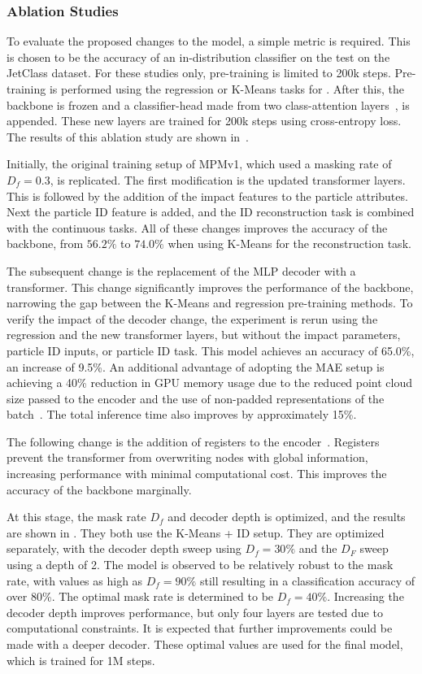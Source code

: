 \subsubsection{Ablation Studies}

To evaluate the proposed changes to the model, a simple metric is required.
This is chosen to be the accuracy of an in-distribution classifier on the test on the JetClass dataset.
For these studies only, pre-training is limited to 200k steps.
Pre-training is performed using the regression or K-Means tasks for \xc.
After this, the backbone is frozen and a classifier-head made from two class-attention layers~\cite{GoingDeeper}, is appended.
These new layers are trained for 200k steps using cross-entropy loss.
The results of this ablation study are shown in~.

Initially, the original training setup of MPMv1, which used a masking rate of $D_f=0.3$, is replicated.
The first modification is the updated transformer layers.
This is followed by the addition of the impact features to the particle attributes.
Next the particle ID feature is added, and the ID reconstruction task is combined with the continuous tasks.
All of these changes improves the accuracy of the backbone, from $56.2\%$ to $74.0\%$ when using K-Means for the reconstruction task.

The subsequent change is the replacement of the MLP decoder with a transformer.
This change significantly improves the performance of the backbone, narrowing the gap between the K-Means and regression pre-training methods.
To verify the impact of the decoder change, the experiment is rerun using the regression and the new transformer layers, but without the impact parameters, particle ID inputs, or particle ID task.
This model achieves an accuracy of 65.0\%, an increase of 9.5\%.
An additional advantage of adopting the MAE setup is achieving a 40\% reduction in GPU memory usage due to the reduced point cloud size passed to the encoder and the use of non-padded representations of the batch~\cite{FlashAttentionFastMemoryEfficient}.
The total inference time also improves by approximately 15\%.

The following change is the addition of registers to the encoder~\cite{VisionTransformersNeed}.
Registers prevent the transformer from overwriting nodes with global information, increasing performance with minimal computational cost.
This improves the accuracy of the backbone marginally.

At this stage, the mask rate $D_f$ and decoder depth is optimized, and the results are shown in .
They both use the K-Means + ID setup.
They are optimized separately, with the decoder depth sweep using $D_f=30\%$ and the $D_F$ sweep using a depth of 2.
The model is observed to be relatively robust to the mask rate, with values as high as $D_f=90\%$ still resulting in a classification accuracy of over 80\%.
The optimal mask rate is determined to be $D_f=40\%$.
Increasing the decoder depth improves performance, but only four layers are tested due to computational constraints.
It is expected that further improvements could be made with a deeper decoder.
These optimal values are used for the final model, which is trained for 1M steps.

